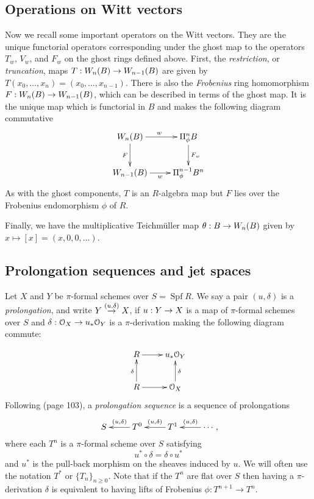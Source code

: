 \documentclass{amsart}
\numberwithin{equation}{section}
\DeclareMathOperator{\Spf}{\mathrm{Spf}}
\def \d{\delta}
\begin{document}
\subsection{Operations on Witt vectors}
\label{subsec-witt-operations}
Now we recall some important operators on the Witt vectors.
They are the unique functorial operators corresponding under the ghost map
to the operators $T_w$, $V_w$, and $F_w$ on the ghost rings defined above.
First, the \emph{restriction}, or \emph{truncation}, maps $T:W_n(B) \rightarrow W_{n-1}(B)$
are given by $T(x_0,\dots,x_n) = 
(x_0,\dots, x_{n-1})$. 
There is also the {\it Frobenius} ring homomorphism
$F:W_n(B) \rightarrow W_{n-1}(B)$, which can be described in terms of the ghost map.
It is the unique map which is functorial in $B$ and makes the
following diagram commutative
        \begin{equation}
        \xymatrix{
        W_n(B) \ar[r]^w \ar[d]_F & \Pi^n_{\phi} B \ar[d]^{F_w} \\
        W_{n-1}(B) \ar[r]_-w & \Pi_{\phi}^{n-1} B^n
        } \label{F}
        \end{equation}
As with the ghost components, $T$ is an $R$-algebra map but $F$ lies over the Frobenius endomorphism $\phi$
of $R$.

Finally, we have the multiplicative Teichm\"uller map $\theta:B \rightarrow W_n(B)$ 
given by $x\mapsto [x]= (x,0,0,\dots)$.

\subsection{Prolongation sequences and jet spaces}
Let $X$ and $Y$ be $\pi$-formal schemes over $S=\Spf R$. We say a pair 
$(u,\d)$ is a {\it prolongation}, and write 
$Y \stk{(u,\d)}{\map} X$, if $u: Y \rightarrow X$ is a map of $\pi$-formal schemes 
over $S$ and $\d: \Ou_X \map u_*\Ou_Y$ is a 
$\pi$-derivation making the following diagram commute: 

$$
	\xymatrix{
	R \ar[r] &  u_* \Ou_Y \\
	R \ar[u]^\d \ar[r] &  \Ou_X \ar[u]_\d \\
	} 
	$$ 
Following \cite{MR1748272} (page 103), a {\it prolongation sequence} is a 
sequence of prolongations
	$$
	\xymatrix{
	S & T^0 \ar_-{(u,\d)}[l] & T^1 \ar_-{(u,\d)}[l] & \cdots\ar_-{(u,\d)}[l]},
	$$
where each $T^n$ is a $\pi$-formal scheme over $S$ satisfying 
$$u^* \circ \d = \d \circ u^*
$$
and $u^*$ is the pull-back morphism on the sheaves induced by $u$.
We will often use the 
notation $T^*$ or $\{T_n\}_{n \geq 0}$.
Note that if the  $T^n$ are flat over $S$ then having a 
$\pi$-derivation $\d$ is equivalent to having lifts of Frobenius $\phi:T^{n+1}
\to T^n$.
\end{document}
